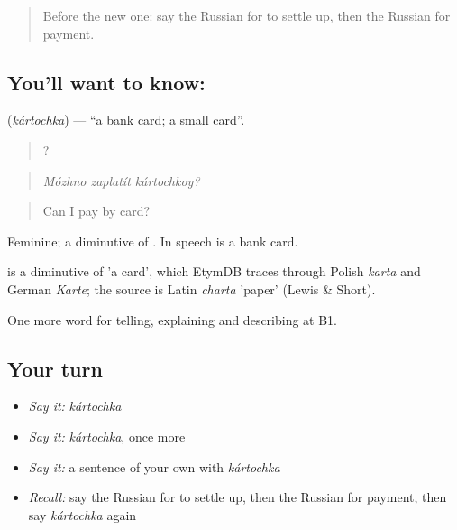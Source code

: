 \label{lesson:RU-C455-kartochka}



\begin{quote}
Before the new one: say the Russian for to settle up, then the Russian for payment.
\end{quote}

\subsection*{You'll want to know: }
\textbf{} (\emph{kártochka}) — \textquotedblleft{}a bank card; a small card\textquotedblright{}.

\begin{quote}
  ?
\end{quote}

\begin{quote}
\emph{Mózhno zaplatít kártochkoy?}
\end{quote}

\begin{quote}
Can I pay by card?
\end{quote}

Feminine; a diminutive of \emph{}. In speech \emph{} is a bank card.

\begin{cousinweb}
\emph{} is a diminutive of \emph{} 'a card', which EtymDB traces through Polish \emph{karta} and German \emph{Karte}; the source is Latin \emph{charta} 'paper' (Lewis \& Short).
\end{cousinweb}

\begin{grammarlens}[title={What you've built}]
One more word for telling, explaining and describing at B1.
\end{grammarlens}

\subsection*{Your turn}
\begin{itemize}
\raggedright
  \item \emph{Say it:} \emph{kártochka}
  \item \emph{Say it:} \emph{kártochka}, once more
  \item \emph{Say it:} a sentence of your own with \emph{kártochka}
  \item \emph{Recall:} say the Russian for to settle up, then the Russian for payment, then say \emph{kártochka} again
\end{itemize}

